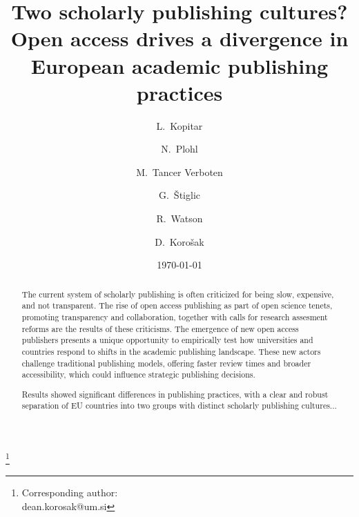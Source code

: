 \documentclass[amsfonts, amssymb, prl, superscriptaddress, notitlepage, twocolumn, nofootinbib]{revtex4-2}
\begin{document}
\title{Two scholarly publishing cultures? Open access drives a divergence in European academic publishing practices}
\author{L.~Kopitar }

\author{N.~Plohl}

\author{M.~Tancer Verboten}


\author{G.~Štiglic }

\author{R.~Watson }

\author{D.~Korošak  }
\thanks{Corresponding author:\\dean.korosak@um.si}




\date{\today}

\begin{abstract}
The current system of scholarly publishing is often criticized for being slow, expensive, and not transparent. The rise of open access publishing as part of open science tenets, promoting transparency and collaboration, together with calls for research assesment reforms are the results of these criticisms. The emergence of new open access publishers presents a unique opportunity to empirically test how universities and countries respond to shifts in the academic publishing landscape. These new actors challenge traditional publishing models, offering faster review times and broader accessibility, which could influence strategic publishing decisions.

Results showed significant differences in publishing practices, with a clear and robust separation of EU countries into two groups with distinct scholarly publishing cultures...
\end{abstract}

\maketitle 
\end{document}
